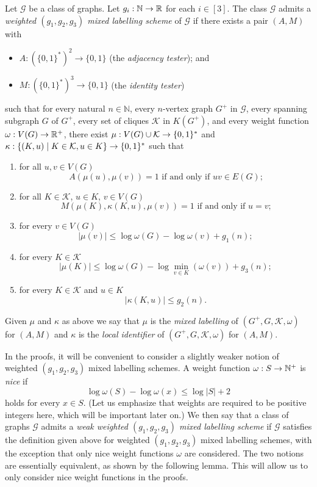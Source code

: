 \documentclass{patmorin}
\renewcommand{\le}{\leqslant}
\renewcommand{\leq}{\leqslant}
\newcommand{\defin}[1]{\emph{\textcolor{brightmaroon}{#1}}}
\newcommand{\NN}{\mathbb{N}}
\DeclarePairedDelimiter{\set}{\{}{\}}
\begin{document}
Let $\mathcal{G}$ be a class of graphs.
Let $g_i:\NN\to\R$ for each $i\in[3]$.
The class  $\mathcal{G}$ admits a \defin{weighted $(g_1,g_2,g_3)$ mixed labelling scheme} of $\mathcal{G}$ if there exists a pair $(A,M)$ with
\begin{itemize}[nosep,nolistsep]
     \item $A:(\{0,1\}^*)^2\to\{0,1\}$ (the \defin{adjacency tester}); and
     \item $M:(\{0,1\}^*)^3\to\{0,1\}$ (the \defin{identity tester})
\end{itemize}
such that
for every natural $n\in\NN$,
every $n$-vertex graph $G^+$ in $\mathcal{G}$,
every spanning subgraph $G$ of $G^+$,
every set of cliques $\mathcal{K}$ in $K(G^+)$, and
every weight function $\omega:V(G)\to \mathbb{R}^+$,
there exist $\mu: V(G)\cup \mathcal{K} \to \set{0,1}^*$ and $\kappa:\{(K, u)\mid K\in \mathcal{K}, u\in K\}\to \set{0,1}^*$
such that
\begin{enumerate}[nosep,nolistsep,label=(\roman*)]
    \item for all $u,v\in V(G)$
    \[
    \textrm{$A(\mu(u),\mu(v))=1$ if and only if $uv\in E(G)$;}
    \]
    \item for all $K\in \mathcal{K}$, $u\in K$, $v\in V(G)$
    \[
    \textrm{$M(\mu(K),\kappa(K, u),\mu(v))=1$ if and only if $u=v$;}
    \]
    \item for every $v\in V(G)$
    \[
    |\mu(v)| \leq \log \omega(G) - \log\omega(v) + g_1(n);
    \]
    \item for every $K\in \mathcal{K}$
    \[
    |\mu(K)|\le \log \omega(G) - \log\min_{v\in K}(\omega(v)) + g_3(n);
    \]
    \item  for every $K\in \mathcal{K}$ and $u\in K$
    \[
    |\kappa(K, u)| \leq g_2(n).
    \]
\end{enumerate}
Given $\mu$ and $\kappa$  as above
we say that $\mu$ is the \defin{mixed labelling} of $(G^+,G,\mathcal{K},\omega)$ for $(A,M)$ and $\kappa$ is the \defin{local identifier} of $(G^+,G,\mathcal{K},\omega)$ for $(A,M)$.

In the proofs, it will be convenient to consider a slightly weaker notion of weighted $(g_1,g_2,g_3)$ mixed labelling schemes.
A weight function $\omega:S\to \mathbb{N}^+$ is \defin{nice} if
\[
\log \omega(S) - \log \omega(x) \leq \log |S| + 2
\]
holds for every $x\in S$.
(Let us emphasize that weights are required to be positive integers here, which will be important later on.)
We then say that a class of graphs $\mathcal{G}$ admits a \defin{weak weighted $(g_1,g_2,g_3)$ mixed labelling scheme} if $\mathcal{G}$ satisfies the definition given above for weighted $(g_1,g_2,g_3)$ mixed labelling schemes, with the exception that only nice weight functions $\omega$ are considered.
The two notions are essentially equivalent, as shown by the following lemma. This will allow us to only consider nice weight functions in the proofs.
\end{document}

